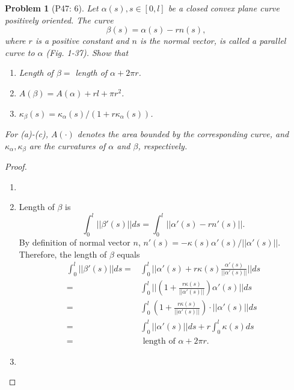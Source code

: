 \documentclass[12pt,a4paper]{article}
\newcounter{theProblemCounter}
\newtheorem{problem}[theProblemCounter]{Problem}
\begin{document}
\setcounter{theProblemCounter}{4}
\begin{problem}[P47: 6]
Let $\alpha(s), s\in [0, l]$ be a closed convex plane curve positively oriented. The curve
\[ \beta(s)=\alpha(s) - rn(s),\]
where $r$ is a positive constant and $n$ is the normal vector, is called a \emph{parallel} curve to $\alpha$ (Fig. 1-37). Show that
\begin{enumerate}
\item[(a)] Length of $\beta = $ length of $\alpha + 2\pi r$.
\item[(b)] $A(\beta)=A(\alpha)+rl+\pi r^2$.
\item[(c)] $\kappa_\beta(s) = \kappa_\alpha(s)/(1+r\kappa_\alpha(s))$.
\end{enumerate}
For (a)-(c), $A(\cdot)$ denotes the area bounded by the corresponding curve, and $\kappa_\alpha, \kappa_\beta$ are the curvatures of $\alpha$ and $\beta$, respectively.
\end{problem}
\begin{proof}
\begin{enumerate}
\item[]
\item[(a)] Length of $\beta$ is 
\[\int_0^l ||\beta'(s)|| ds = \int_0^l ||\alpha'(s)-rn'(s)||.\]
By definition of normal vector $n$, $n'(s)=-\kappa(s)\alpha'(s)/||\alpha'(s)||$. Therefore, the length of $\beta$ equals
\begin{align*}
\int_0^l ||\beta'(s)|| ds =& \int_0^l ||\alpha'(s)+r\kappa(s)\frac{\alpha'(s)}{||\alpha'(s)||}|| ds \\
 =& \int_0^l ||(1+\frac{r\kappa(s)}{||\alpha'(s)||})\alpha'(s)|| ds\\
 =& \int_0^l (1+\frac{r\kappa(s)}{||\alpha'(s)||})\cdot ||\alpha'(s)|| ds\\
 =& \int_0^l ||\alpha'(s)|| ds + r\int_0^l \kappa(s) ds\\
 =& \mbox{ length of $\alpha$} + 2\pi r.
\end{align*}
\item[(b)]
\end{enumerate}

\end{proof}
\setcounter{theProblemCounter}{7}
\end{document}
